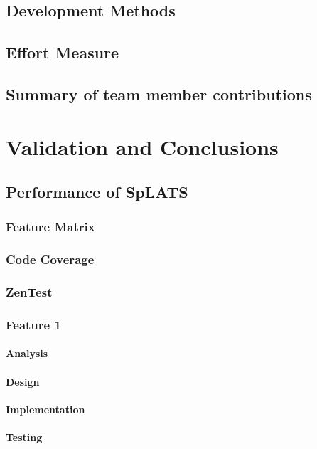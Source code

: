 \documentclass{report}
\begin{document}
\section{Development Methods}
\section{Effort Measure}
\section{Summary of team member contributions}

\chapter{Validation and Conclusions}
\section{Performance of SpLATS}
\subsection{Feature Matrix}
\subsection{Code Coverage}
\subsection{ZenTest}
\subsection{Feature 1}
\subsubsection{Analysis}
\subsubsection{Design}
\subsubsection{Implementation}
\subsubsection{Testing}

\appendix
\end{document}
